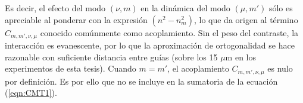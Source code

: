 Es decir, el efecto del modo $(\nu, m)$ en la dinámica del modo $(\mu, m')$ sólo es apreciable al ponderar con la expresión $(n^2 - n^2_{m})$, lo que da origen al término $C_{m, m', \nu, \mu}$ conocido comúnmente como acoplamiento. Sin el peso del contraste, la interacción es evanescente, por lo que la aproximación de ortogonalidad se hace razonable con suficiente distancia entre guías (sobre los 15 $\mu$m en los experimentos de esta tesis). Cuando $m=m'$, el acoplamiento $C_{m, m', \nu, \mu}$ es nulo por definición. Es por ello que no se incluye en la sumatoria de la ecuación (\ref{eqn:CMT1}).

	
